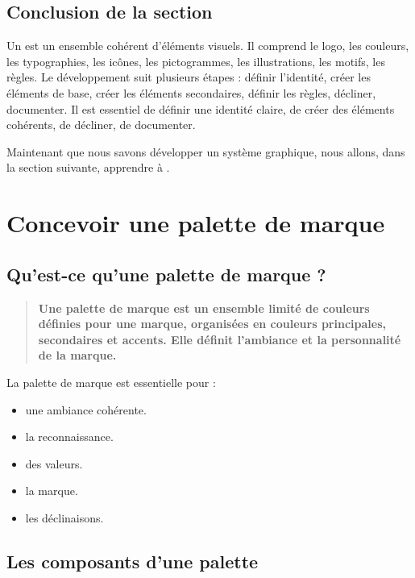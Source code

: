 \subsection*{Conclusion de la section}

Un  est un ensemble cohérent d'éléments visuels. Il comprend le logo, les couleurs, les typographies, les icônes, les pictogrammes, les illustrations, les motifs, les règles. Le développement suit plusieurs étapes : définir l'identité, créer les éléments de base, créer les éléments secondaires, définir les règles, décliner, documenter. Il est essentiel de définir une identité claire, de créer des éléments cohérents, de décliner, de documenter.

Maintenant que nous savons développer un système graphique, nous allons, dans la section suivante, apprendre à .

\section{Concevoir une palette de marque}

\subsection{Qu'est-ce qu'une palette de marque ?}

\begin{quote}
\textbf{Une palette de marque est un ensemble limité de couleurs définies pour une marque, organisées en couleurs principales, secondaires et accents. Elle définit l'ambiance et la personnalité de la marque.}
\end{quote}

La palette de marque est essentielle pour :

\begin{itemize}
    \item {} une ambiance cohérente.
    \item {} la reconnaissance.
    \item {} des valeurs.
    \item {} la marque.
    \item {} les déclinaisons.
\end{itemize}

\subsection{Les composants d'une palette}

